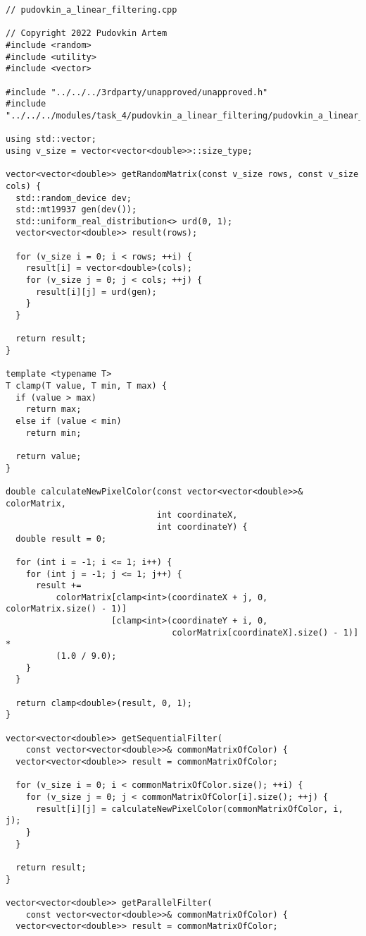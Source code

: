 \documentclass{report}
\begin{document}
\begin{lstlisting}
// pudovkin_a_linear_filtering.cpp

// Copyright 2022 Pudovkin Artem
#include <random>
#include <utility>
#include <vector>

#include "../../../3rdparty/unapproved/unapproved.h"
#include "../../../modules/task_4/pudovkin_a_linear_filtering/pudovkin_a_linear_filtering.h"

using std::vector;
using v_size = vector<vector<double>>::size_type;

vector<vector<double>> getRandomMatrix(const v_size rows, const v_size cols) {
  std::random_device dev;
  std::mt19937 gen(dev());
  std::uniform_real_distribution<> urd(0, 1);
  vector<vector<double>> result(rows);

  for (v_size i = 0; i < rows; ++i) {
    result[i] = vector<double>(cols);
    for (v_size j = 0; j < cols; ++j) {
      result[i][j] = urd(gen);
    }
  }

  return result;
}

template <typename T>
T clamp(T value, T min, T max) {
  if (value > max)
    return max;
  else if (value < min)
    return min;

  return value;
}

double calculateNewPixelColor(const vector<vector<double>>& colorMatrix,
                              int coordinateX,
                              int coordinateY) {
  double result = 0;

  for (int i = -1; i <= 1; i++) {
    for (int j = -1; j <= 1; j++) {
      result +=
          colorMatrix[clamp<int>(coordinateX + j, 0, colorMatrix.size() - 1)]
                     [clamp<int>(coordinateY + i, 0,
                                 colorMatrix[coordinateX].size() - 1)] *
          (1.0 / 9.0);
    }
  }

  return clamp<double>(result, 0, 1);
}

vector<vector<double>> getSequentialFilter(
    const vector<vector<double>>& commonMatrixOfColor) {
  vector<vector<double>> result = commonMatrixOfColor;

  for (v_size i = 0; i < commonMatrixOfColor.size(); ++i) {
    for (v_size j = 0; j < commonMatrixOfColor[i].size(); ++j) {
      result[i][j] = calculateNewPixelColor(commonMatrixOfColor, i, j);
    }
  }

  return result;
}

vector<vector<double>> getParallelFilter(
    const vector<vector<double>>& commonMatrixOfColor) {
  vector<vector<double>> result = commonMatrixOfColor;


\end{lstlisting}
\end{document}
